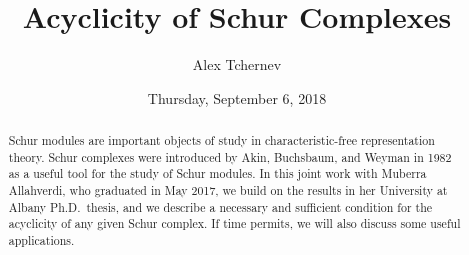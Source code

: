 \documentclass{UAmathtalk}
\author{Alex Tchernev}
\title{Acyclicity of Schur Complexes}
\date{Thursday, September 6, 2018}
\begin{document}
\maketitle

\begin{abstract}
Schur modules are important objects of study in characteristic-free representation theory. Schur complexes were introduced by Akin, Buchsbaum, and Weyman in 1982 as a useful tool for the study of Schur modules. In this joint work with Muberra Allahverdi, who graduated in May 2017, we build on the results in her University at Albany Ph.D.\ thesis, and we describe a necessary and sufficient condition for the acyclicity of any given Schur complex. If time permits, we will also discuss some useful applications.
\end{abstract}
\end{document}
